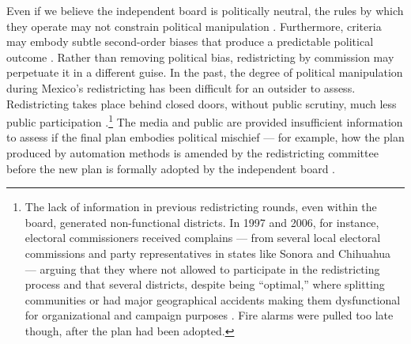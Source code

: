 \documentclass[letter,12pt]{article}
\begin{document}
Even if we believe the independent board is politically neutral, the rules by which they operate may not constrain political manipulation \citep{lijphart.1990,rossiter.etal.1997,estevez.magar.rosas.2008}. Furthermore, criteria may embody subtle second-order biases that produce a predictable political outcome \citep{parker.1990}. Rather than removing political bias, redistricting by commission may perpetuate it in a different guise. In the past, the degree of political manipulation during Mexico's redistricting has been difficult for an outsider to assess. Redistricting takes place behind closed doors, without public scrutiny, much less public participation \citep{trelles.mtz.tesisItam.2007,trelles.datosabiertos.2015}.\footnote{The lack of information in previous redistricting rounds, even within the board, generated non-functional districts. In 1997 and 2006, for instance, electoral commissioners received complains --- from several local electoral commissions and party representatives in states like Sonora and Chihuahua --- arguing that they where not allowed to participate in the redistricting process and that several districts, despite being ``optimal,'' where splitting communities or had major geographical accidents making them dysfunctional for organizational and campaign purposes \citep{trelles.mtz.tesisItam.2007}. Fire alarms were pulled too late though, after the plan had been adopted.} The media and public are provided insufficient information to assess if the final plan embodies political mischief --- for example, how the plan produced by automation methods is amended by the redistricting committee before the new plan is formally adopted by the independent board \citep{trelles.datosabiertos.2015}.
\end{document}
